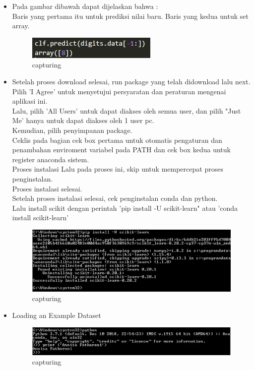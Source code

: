\begin{enumerate}
\begin{itemize}
\item 
Pada gambar dibawah dapat dijelaskan bahwa :\\
Baris yang pertama itu untuk prediksi nilai baru. 
Baris yang kedua untuk set array.
\begin{figure}[ht]
\centering
 \includegraphics[scale=0.5]{figures/cahya3.png}
\caption{capturing}	
\end{figure}
 
\item
Setelah proses download selesai, run package yang telah didownload lalu next.\\
Pilih 'I Agree' untuk menyetujui persyaratan dan peraturan mengenai aplikasi ini.\\
Lalu, pilih 'All Users' untuk dapat diakses oleh semua user, dan pilih "Just Me' hanya untuk dapat diakses oleh 1 user pc.\\
Kemudian, pilih penyimpanan package.\\
Ceklis pada bagian cek box pertama untuk otomatis pengaturan dan penambahan enviroment variabel pada PATH dan cek box kedua untuk register anaconda sistem.\\
 Proses instalasi
Lalu pada proses ini, skip untuk mempercepat proses penginstalan.\\
Proses instalasi selesai.\\
Setelah proses instalasi selesai, cek penginstalan conda dan python.\\
Lalu install scikit dengan perintah 'pip install -U scikit-learn" atau 'conda install scikit-learn'
\begin{figure}[ht]
\centering
\includegraphics[scale=0.5]{figures/12.jpg}
\caption{capturing}
\label{proses instalasi}
\end{figure}

\item Loading an Example Dataset
\begin{figure}[ht]
\centering
\includegraphics[scale=0.5]{figures/Capture2.jpg}
\caption{capturing}
\label{uji coba}
\end{figure}


\end{itemize}
\end{enumerate}
